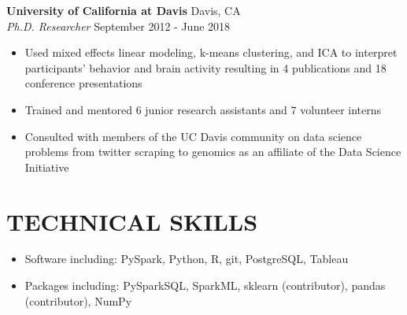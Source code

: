 \documentclass[line,margin,10pt]{res}
\begin{document}
\begin{resume}
\begin{itemize}
\end{itemize}
{\vspace{-0.25cm}}
\textbf{University of California at Davis} \hfill Davis, CA \\
{\sl Ph.D. Researcher} \hfill September 2012 - June 2018
\begin{itemize} \itemsep -2pt
\item Used mixed effects linear modeling, k-means clustering, and ICA to interpret participants' behavior and brain activity resulting in 4 publications and 18 conference presentations
\item Trained and mentored 6 junior research assistants and 7 volunteer interns
\item Consulted with members of the UC Davis community on data science problems from twitter scraping to genomics as an affiliate of the Data Science Initiative
\end{itemize}
{\vspace{-0.25cm}}


 \section{TECHNICAL SKILLS} 
 \begin{itemize}[leftmargin=-2pt] \itemsep -2pt
\item [] Software including: PySpark, Python, R, git, PostgreSQL, Tableau
\item []Packages including: PySparkSQL, SparkML, sklearn (contributor), pandas (contributor), NumPy%
 \end{itemize}
{\vspace{-0.25cm}}


\end{resume}
\end{document}
